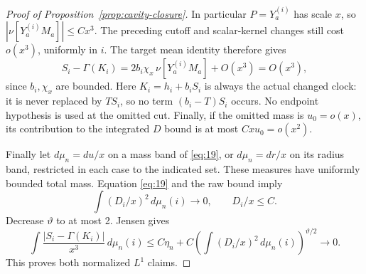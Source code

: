 \begin{proof}[Proof of Proposition~\ref{prop:cavity-closure}]
In particular \(P=Y_a^{(i)}\) has scale \(x\),
so \(|\nu[Y_a^{(i)}M_a]|\le Cx^3\).
The preceding cutoff and scalar-kernel changes
still cost \(o(x^3)\), uniformly in \(i\).
The target mean identity therefore gives
\[
 S_i-\Gamma(K_i)
      =2b_i\chi_x\,\nu[Y_a^{(i)}M_a]+O(x^3)=O(x^3),
\]
since \(b_i,\chi_x\) are bounded. Here
\(K_i=h_i+b_iS_i\) is always the actual changed
clock: it is never replaced by \(TS_i\), so
no term \((b_i-T)S_i\) occurs. No endpoint
hypothesis is used at the omitted cut.
Finally, if the omitted mass is \(u_0=o(x)\),
its contribution to the integrated \(D\)
bound is at most \(Cx u_0=o(x^2)\).

Finally let \(d\mu_n=du/x\) on a mass band
of \eqref{eq:19}, or \(d\mu_n=dr/x\) on
its radius band, restricted in each case
to the indicated set. These measures have
uniformly bounded total mass. Equation
\eqref{eq:19} and the raw bound imply
\[
 \int(D_i/x)^2\,d\mu_n(i)\longrightarrow0,\qquad D_i/x\le C.
\]
Decrease \(\vartheta\) to at most 2.
Jensen gives
\[
 \int\frac{|S_i-\Gamma(K_i)|}{x^3}\,d\mu_n(i)
 \le C\eta_n+
 C\left(\int(D_i/x)^2\,d\mu_n(i)\right)^{\vartheta/2}
 \longrightarrow0.
\]
This proves both normalized \(L^1\) claims.
\end{proof}
